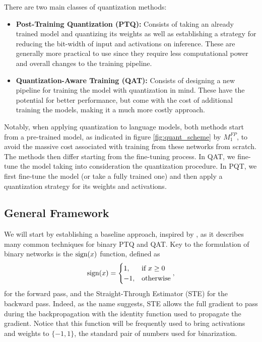 \newpage
There are two main classes of quantization methods: 
\begin{itemize}
    \item \textbf{Post-Training Quantization (PTQ): } Consists of taking an already trained model and quantizing its weights as well as establishing a strategy for reducing the bit-width of input and activations on inference. These are generally more practical to use since they require less computational power and overall changes to the training pipeline.

    \item \textbf{Quantization-Aware Training (QAT): } Consists of designing a new pipeline for training the model with quantization in mind. These have the potential for better performance, but come with the cost of additional training the models, making it a much more costly approach.    
\end{itemize}

Notably, when applying quantization to language models, both methods start from a pre-trained model, as indicated in figure \ref{fig:quant_scheme} by $M_1^{FP}$, to avoid the massive cost associated with training from these networks from scratch. The methods then differ starting from the fine-tuning process. In QAT, we fine-tune the model taking into consideration the quantization procedure. In PQT, we first fine-tune the model (or take a fully trained one) and then apply a quantization strategy for its weights and activations.

\subsection{General Framework}

We will start by establishing a baseline approach, inspired by \cite{Qin2022bibert}, as it describes many common techniques for binary PTQ and QAT. Key to the formulation of binary networks is the $\text{sign}(x)$ function, defined as
\begin{equation}
    \text{sign}(x) = \begin{cases}
        1, & \text{if } x \geq 0 \\
        -1, & \text{otherwise}
    \end{cases},
\end{equation}
for the forward pass, and the Straight-Through Estimator (STE)\cite{bengio2013estimating} for the backward pass. Indeed, as the name suggests, STE allows the full gradient to pass during the backpropagation with the identity function used to propagate the gradient. Notice that this function will be frequently used to bring activations and weights to $\{-1, 1\}$, the standard pair of numbers used for binarization.

